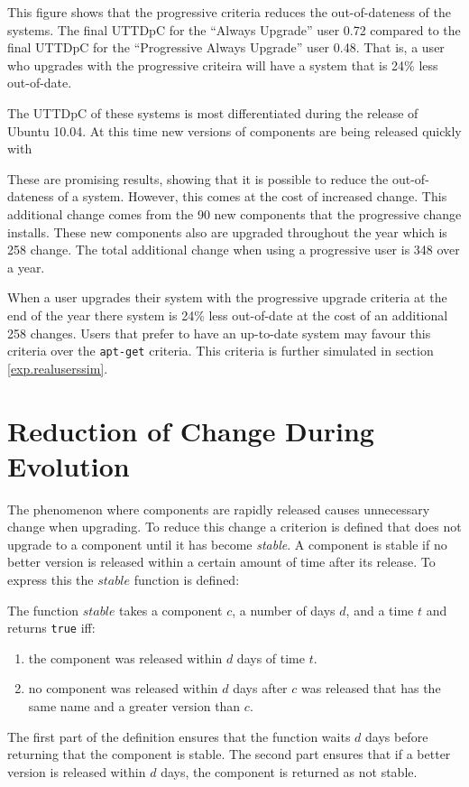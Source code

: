 This figure shows that the progressive criteria reduces the out-of-dateness of the systems.
The final UTTDpC for the ``Always Upgrade'' user 0.72 compared to the final UTTDpC for the ``Progressive Always Upgrade'' user 0.48.
That is, a user who upgrades with the progressive criteira will have a system that is 24\% less out-of-date.

The UTTDpC of these systems is most differentiated during the release of Ubuntu 10.04.
At this time new versions of components are being released quickly with   

These are promising results, showing that it is possible to reduce the out-of-dateness of a system.
However, this comes at the cost of increased change.
This additional change comes from the 90 new components that the progressive change installs.
These new components also are upgraded throughout the year which is 258 change.
The total additional change when using a progressive user is 348 over a year.  

When a user upgrades their system with the progressive upgrade criteria at the end of the year there system is 24\% less out-of-date at the cost of an additional 258 changes.
Users that prefer to have an up-to-date system may favour this criteria over the \texttt{apt-get} criteria. 
This criteria is further simulated in section \ref{exp.realuserssim}.

\section{Reduction of Change During Evolution}
\label{exp.stable}
The phenomenon where components are rapidly released causes unnecessary change when upgrading.
To reduce this change a criterion is defined that does not upgrade to a component until it has become \textit{stable}.
A component is stable if no better version is released within a certain amount of time after its release.
To express this the $stable$ function is defined:
\begin{defs}
The function $stable$ takes a component $c$, a number of days $d$, and a time $t$ and returns \texttt{true} iff:
\begin{enumerate}
  \item the component was released within $d$ days of time $t$.
  \item no component was released within $d$ days after $c$ was released that has the same name and a greater version than $c$.
\end{enumerate}
\end{defs}
The first part of the definition ensures that the function waits $d$ days before returning that the component is stable.
The second part ensures that if a better version is released within $d$ days, the component is returned as not stable.

